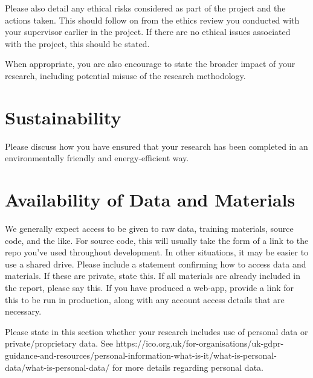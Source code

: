 \documentclass[12pt,twoside]{report}
\begin{document}
Please also detail any ethical risks considered as part of the project and the actions taken. This should follow on from the ethics review you conducted with your supervisor earlier in the project. If there are no ethical issues associated with the project, this should be stated. 

When appropriate, you are also encourage to state the broader impact of your research, including potential misuse of the research methodology.

\section{Sustainability}

Please discuss how you have ensured that your research has been completed in an environmentally friendly and energy-efficient way.

\section{Availability of Data and Materials}
We generally expect access to be given to raw data, training materials, source code, and the like. For source code, this will usually take the form of a link to the repo you’ve used throughout development. In other situations, it may be easier to use a shared drive. Please include a statement confirming how to access data and materials. If these are private, state this. If all materials are already included in the report, please say this. If you have produced a web-app, provide a link for this to be run in production, along with any account access details that are necessary.

Please state in this section whether your research includes use of personal data or private/proprietary data. See https://ico.org.uk/for-organisations/uk-gdpr-guidance-and-resources/personal-information-what-is-it/what-is-personal-data/what-is-personal-data/ for more details regarding personal data.


\end{document}
